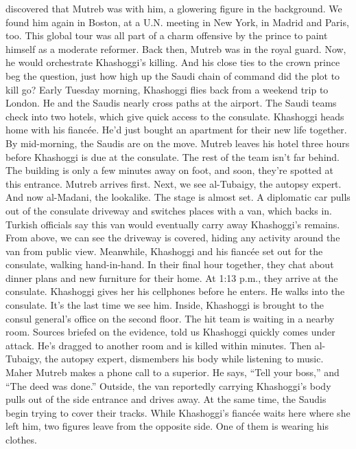 \begin{itemize}
  discovered that Mutreb was with him, a glowering figure in the
  background. We found him again in Boston, at a U.N. meeting in New
  York, in Madrid and Paris, too. This global tour was all part of a
  charm offensive by the prince to paint himself as a moderate reformer.
  Back then, Mutreb was in the royal guard. Now, he would orchestrate
  Khashoggi's killing. And his close ties to the crown prince beg the
  question, just how high up the Saudi chain of command did the plot to
  kill go? Early Tuesday morning, Khashoggi flies back from a weekend
  trip to London. He and the Saudis nearly cross paths at the airport.
  The Saudi teams check into two hotels, which give quick access to the
  consulate. Khashoggi heads home with his fiancée. He'd just bought an
  apartment for their new life together. By mid-morning, the Saudis are
  on the move. Mutreb leaves his hotel three hours before Khashoggi is
  due at the consulate. The rest of the team isn't far behind. The
  building is only a few minutes away on foot, and soon, they're spotted
  at this entrance. Mutreb arrives first. Next, we see al-Tubaigy, the
  autopsy expert. And now al-Madani, the lookalike. The stage is almost
  set. A diplomatic car pulls out of the consulate driveway and switches
  places with a van, which backs in. Turkish officials say this van
  would eventually carry away Khashoggi's remains. From above, we can
  see the driveway is covered, hiding any activity around the van from
  public view. Meanwhile, Khashoggi and his fiancée set out for the
  consulate, walking hand-in-hand. In their final hour together, they
  chat about dinner plans and new furniture for their home. At 1:13
  p.m., they arrive at the consulate. Khashoggi gives her his cellphones
  before he enters. He walks into the consulate. It's the last time we
  see him. Inside, Khashoggi is brought to the consul general's office
  on the second floor. The hit team is waiting in a nearby room. Sources
  briefed on the evidence, told us Khashoggi quickly comes under attack.
  He's dragged to another room and is killed within minutes. Then
  al-Tubaigy, the autopsy expert, dismembers his body while listening to
  music. Maher Mutreb makes a phone call to a superior. He says, ``Tell
  your boss,'' and ``The deed was done.'' Outside, the van reportedly
  carrying Khashoggi's body pulls out of the side entrance and drives
  away. At the same time, the Saudis begin trying to cover their tracks.
  While Khashoggi's fiancée waits here where she left him, two figures
  leave from the opposite side. One of them is wearing his clothes.

\end{itemize}
